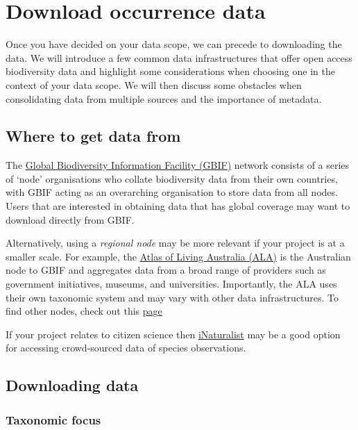 \documentclass[
  letterpaper,
  DIV=11,
  numbers=noendperiod,
  oneside]{scrreprt}
\begin{document}

\hypertarget{sec-download-data}{%
\chapter{Download occurrence data}\label{sec-download-data}}

Once you have decided on your data scope, we can precede to downloading
the data. We will introduce a few common data infrastructures that offer
open access biodiversity data and highlight some considerations when
choosing one in the context of your data scope. We will then discuss
some obstacles when consolidating data from multiple sources and the
importance of metadata.

\hypertarget{where-to-get-data-from}{%
\section{Where to get data from}\label{where-to-get-data-from}}

The \href{https://www.gbif.org/}{Global Biodiversity Information
Facility (GBIF)} network consists of a series of `node' organisations
who collate biodiversity data from their own countries, with GBIF acting
as an overarching organisation to store data from all nodes. Users that
are interested in obtaining data that has global coverage may want to
download directly from GBIF.

Alternatively, using a \emph{regional node} may be more relevant if your
project is at a smaller scale. For example, the
\href{www.ala.org.au}{Atlas of Living Australia (ALA)} is the Australian
node to GBIF and aggregates data from a broad range of providers such as
government initiatives, museums, and universities. Importantly, the ALA
uses their own taxonomic system and may vary with other data
infrastructures. To find other nodes, check out this
\href{https://www.gbif.org/the-gbif-network}{page}

If your project relates to citizen science then
\href{https://www.inaturalist.org/}{iNaturalist} may be a good option
for accessing crowd-sourced data of species observations.

\hypertarget{downloading-data}{%
\section{Downloading data}\label{downloading-data}}

\hypertarget{taxonomic-focus}{%
\subsection{Taxonomic focus}\label{taxonomic-focus}}
\end{document}
